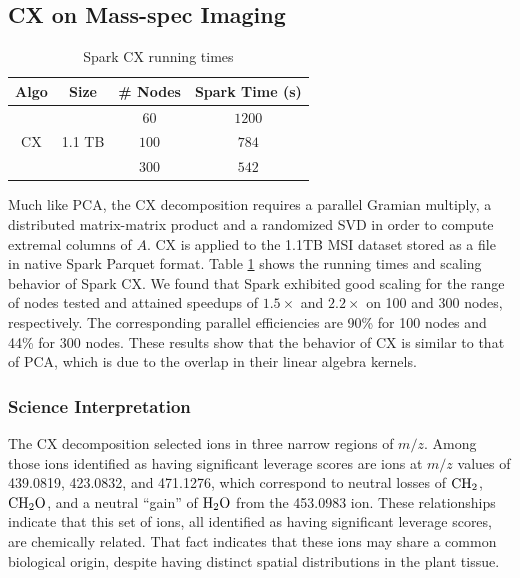 \subsection{CX on Mass-spec Imaging}
\begin{table}[t]
\centering
\begin{tabular}{|c|c|c|c|} \hline
Algo & Size & \# Nodes & Spark Time (s)\\ \hline
\multirow{3}{*}{CX} & \multirow{3}{*}{1.1 TB} & $60$ & $1200$\\
{} & {} & $100$  & $784$\\
{} & {} & $300$ & $542$\\ \hline
\end{tabular}
\caption{Spark CX running times}
\label{tab:cxscale}
\end{table}
Much like PCA, the CX decomposition requires a parallel Gramian multiply, a distributed matrix-matrix product and a randomized SVD in order to compute extremal columns of $A$. CX is applied to the 1.1TB MSI dataset stored as a file in native Spark Parquet format. Table \ref{tab:cxscale} shows the running times and scaling behavior of Spark CX. We found that Spark exhibited good scaling for the range of nodes tested and attained speedups of $1.5\times$ and $2.2\times$ on 100 and 300 nodes, respectively. The corresponding parallel efficiencies are 90\% for 100 nodes and 44\% for 300 nodes. These results show that the behavior of CX is similar to that of PCA, which is due to the overlap in their linear algebra kernels.
\subsubsection{Science Interpretation}
 The CX decomposition selected ions in three narrow regions of $m/z$. Among those ions identified as having significant leverage scores are ions at $m/z$ values of 439.0819, 423.0832, and 471.1276, which correspond to neutral losses of $\rm{CH_2}$, $\rm{CH_2O}$, and a neutral ``gain'' of $\rm{H_2O}$ from the 453.0983 ion.  These relationships indicate that this set of ions, all identified as having significant leverage scores, are chemically related.  That fact indicates that these ions may share a common biological origin, despite having distinct spatial distributions in the plant tissue.  


